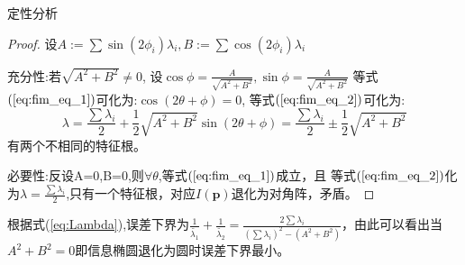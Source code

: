 \documentclass[notheorems,xetex,mathserif,serif]{beamer}
\begin{document}
\begin{frame}{定性分析}
\begin{proof}
设$A:=\sum\sin(2\phi_i)\lambda_i,B:=\sum\cos(2\phi_i)\lambda_i$

充分性:若$\sqrt{A^2+B^2} \neq 0$,
设$\cos\phi=\frac{A}{\sqrt{A^2+B^2}},\sin\phi=\frac{A}{\sqrt{A^2+B^2}}$
等式$(\ref{eq:fim_eq_1})$可化为:$\cos(2\theta+\phi)=0$,
等式$(\ref{eq:fim_eq_2})$可化为:
\begin{equation}\label{eq:Lambda}
\lambda=\frac{\sum \lambda_i}{2}+\frac{1}{2}\sqrt{A^2+B^2}\sin(2\theta+\phi)=\frac{\sum \lambda_i}{2}\pm\frac{1}{2}\sqrt{A^2+B^2}
\end{equation}
有两个不相同的特征根。

必要性:反设A=0,B=0,则$\forall \theta$,等式$(\ref{eq:fim_eq_1})$成立，且
等式$(\ref{eq:fim_eq_2})$化为$\lambda=\frac{\sum \lambda_i}{2}$,只有一个特征根，对应$I(\bm{p})$退化为对角阵，矛盾。

\end{proof}
根据式(\ref{eq:Lambda}),误差下界为$\frac{1}{\tilde{\lambda_1}}+\frac{1}{\tilde{\lambda_2}}=\frac{2\sum \lambda_i}{(\sum \lambda_i)^2-(A^2+B^2)}$，由此可以看出当$A^2+B^2=0$即信息椭圆退化为圆时误差下界最小。
\end{frame}
\end{document}
